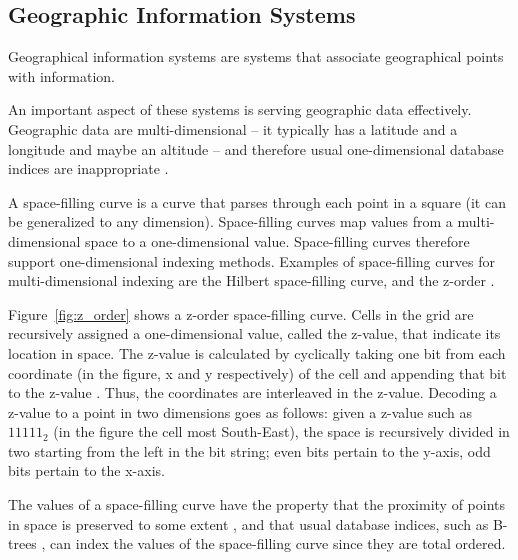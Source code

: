 \subsection{Geographic Information Systems}
Geographical information systems are systems that associate geographical points
with information.

An important aspect of these systems is serving geographic data
effectively. Geographic data are multi-dimensional -- it typically has a latitude
and a longitude and maybe an altitude -- and therefore usual one-dimensional
database indices are inappropriate \citep[p.173]{multidimensionalaccess:Gaede97}.

A space-filling curve is a curve that parses through each point in a square (it
can be generalized to any dimension). Space-filling curves map values from a
multi-dimensional space to a one-dimensional value. Space-filling curves
therefore support one-dimensional indexing methods. Examples of space-filling
curves for multi-dimensional indexing are the Hilbert space-filling curve, and
the z-order \citep[p.199]{multidimensionalaccess:Gaede97}.

Figure~\ref{fig:z_order} shows a z-order space-filling curve. Cells in the grid
are recursively assigned a one-dimensional value, called the z-value, that
indicate its location in space. The z-value is calculated by cyclically taking
one bit from each coordinate (in the figure, x and y respectively) of the cell and
appending that bit to the z-value \citep[sec.9]{sfc:lawder}. Thus, the
coordinates are interleaved in the z-value. Decoding a z-value to a point in two
dimensions goes as follows: given a z-value such as $11111_2$ (in the figure the
cell most South-East), the space is recursively divided in two starting from the left in
the bit string; even bits pertain to the y-axis, odd bits pertain to the x-axis.

The values of a space-filling curve have the property that the proximity of points
in space is preserved to some extent
\citep[p.199]{multidimensionalaccess:Gaede97}, and that usual database indices,
such as B-trees \citep{btree:bayer72}, can index the values of the space-filling
curve since they are total ordered.


